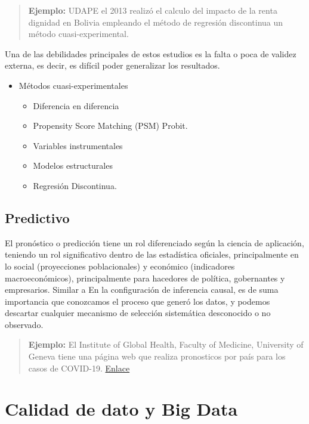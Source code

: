 \documentclass[
]{book}
\providecommand{\tightlist}{%
  \setlength{\itemsep}{0pt}\setlength{\parskip}{0pt}}
\begin{document}
\begin{quote}
\textbf{Ejemplo:} UDAPE el 2013 realizó el calculo del impacto de la renta dignidad en Bolivia empleando el método de regresión discontinua un método cuasi-experimental.
\end{quote}

Una de las debilidades principales de estos estudios es la falta o poca de validez externa, es decir, es difícil poder generalizar los resultados.

\begin{itemize}
\tightlist
\item
  Métodos cuasi-experimentales

  \begin{itemize}
  \tightlist
  \item
    Diferencia en diferencia
  \item
    Propensity Score Matching (PSM) Probit.
  \item
    Variables instrumentales
  \item
    Modelos estructurales
  \item
    Regresión Discontinua.
  \end{itemize}
\end{itemize}

\hypertarget{predictivo}{%
\subsection{Predictivo}\label{predictivo}}

El pronóstico o predicción tiene un rol diferenciado según la ciencia de aplicación, teniendo un rol significativo dentro de las estadística oficiales, principalmente en lo social (proyecciones poblacionales) y económico (indicadores macroeconómicos), principalmente para hacedores de política, gobernantes y empresarios. Similar a
En la configuración de inferencia causal, es de suma importancia que conozcamos el proceso que generó los datos, y podemos descartar cualquier mecanismo de selección sistemática desconocido o no observado.

\begin{quote}
\textbf{Ejemplo:} El Institute of Global Health, Faculty of Medicine, University of Geneva tiene una página web que realiza pronosticos por país para los casos de COVID-19. \href{https://renkulab.shinyapps.io/COVID-19-Epidemic-Forecasting/}{Enlace}
\end{quote}

\hypertarget{calidad-de-dato-y-big-data}{%
\section{Calidad de dato y Big Data}\label{calidad-de-dato-y-big-data}}
\end{document}
